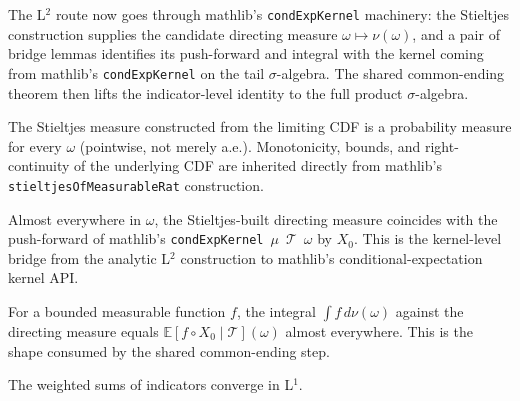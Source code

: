The L$^2$ route now goes through mathlib's \texttt{condExpKernel} machinery:
the Stieltjes construction supplies the candidate directing measure
$\omega \mapsto \nu(\omega)$, and a pair of bridge lemmas identifies its
push-forward and integral with the kernel coming from mathlib's
\texttt{condExpKernel} on the tail $\sigma$-algebra. The shared common-ending
theorem then lifts the indicator-level identity to the full product $\sigma$-algebra.

\begin{lemma}
  \label{lem:directing_measure_isProb_L2}
  \leanok
  The Stieltjes measure constructed from the limiting CDF is a probability measure
  for every $\omega$ (pointwise, not merely a.e.). Monotonicity, bounds, and
  right-continuity of the underlying CDF are inherited directly from mathlib's
  \texttt{stieltjesOfMeasurableRat} construction.
\end{lemma}

\begin{theorem}
  \label{thm:directing_measure_ae_eq_condExpKernel_map}
  \leanok
  Almost everywhere in $\omega$, the Stieltjes-built directing measure coincides
  with the push-forward of mathlib's \texttt{condExpKernel}~$\mu$~$\mathcal{T}$~$\omega$
  by $X_0$. This is the kernel-level bridge from the analytic L$^2$ construction
  to mathlib's conditional-expectation kernel API.
\end{theorem}

\begin{lemma}
  \label{lem:directing_measure_integral_eq_condExp}
  \leanok
  For a bounded measurable function $f$, the integral
  $\int f \, d\nu(\omega)$ against the directing measure equals
  $\mathbb{E}[f \circ X_0 \mid \mathcal{T}](\omega)$ almost everywhere. This is the
  shape consumed by the shared common-ending step.
\end{lemma}

\begin{theorem}
  \label{thm:weighted_sums_L1}
  \leanok
  The weighted sums of indicators converge in L$^1$.
\end{theorem}

